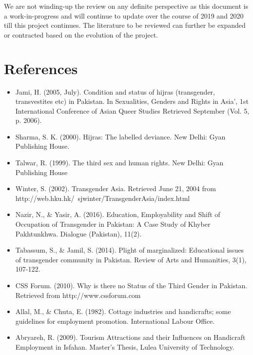 We are not winding-up the review on any definite perspective as this document is a work-in-progress and will continue to update over the course of 2019 and 2020 till this project continues. The literature to be reviewed can further be expanded or contracted based on the evolution of the project. 
\section{References}

\begin{itemize}
     
\item Jami, H. (2005, July). Condition and status of hijras (transgender, transvestites etc) in Pakistan. In Sexualities, Genders and Rights in Asia’, 1st International Conference of Asian Queer Studies Retrieved September (Vol. 5, p. 2006).

\item Sharma, S. K. (2000). Hijras: The labelled deviance. New Delhi: Gyan Publishing House.

\item Talwar, R. (1999). The third sex and human rights. New Delhi: Gyan Publishing House

\item Winter, S. (2002). Transgender Asia. Retrieved June 21, 2004 from http://web.hku.hk/~sjwinter/TransgenderAsia/index.html

\item Nazir, N., \& Yasir, A. (2016). Education, Employability and Shift of Occupation of Transgender in Pakistan: A Case Study of Khyber Pakhtunkhwa. Dialogue (Pakistan), 11(2).

\item Tabassum, S., \& Jamil, S. (2014). Plight of marginalized: Educational issues of transgender community in Pakistan. Review of Arts and Humanities, 3(1), 107-122. 

\item CSS Forum. (2010). Why is there no Status of the Third Gender in Pakistan. Retrieved from http://www.cssforum.com

\item Allal, M., \& Chuta, E. (1982). Cottage industries and handicrafts; some guidelines for employment promotion. International Labour Office.

\item Abryareh, R. (2009). Tourism Attractions and their Influences on Handicraft Employment in Isfahan. Master’s Thesis, Lulea University of Technology.


\end{itemize}

